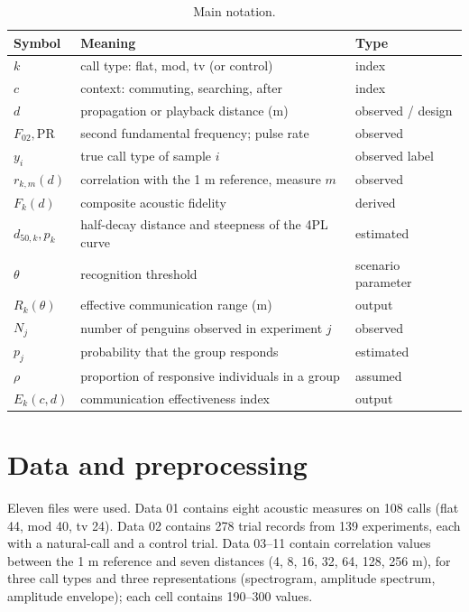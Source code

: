 \documentclass{apmcmthesis}
\begin{document}
\begin{table}[htbp]
\centering
\caption{Main notation.}
\small
\begin{tabular}{lll}
\toprule
Symbol & Meaning & Type \\
\midrule
$k$ & call type: flat, mod, tv (or control) & index \\
$c$ & context: commuting, searching, after & index \\
$d$ & propagation or playback distance (m) & observed / design \\
$F_{02}, \mathrm{PR}$ & second fundamental frequency; pulse rate & observed \\
$y_i$ & true call type of sample $i$ & observed label \\
$r_{k,m}(d)$ & correlation with the 1 m reference, measure $m$ & observed \\
$F_k(d)$ & composite acoustic fidelity & derived \\
$d_{50,k}, p_k$ & half-decay distance and steepness of the 4PL curve & estimated \\
$\theta$ & recognition threshold & scenario parameter \\
$R_k(\theta)$ & effective communication range (m) & output \\
$N_j$ & number of penguins observed in experiment $j$ & observed \\
$p_j$ & probability that the group responds & estimated \\
$\rho$ & proportion of responsive individuals in a group & assumed \\
$E_k(c,d)$ & communication effectiveness index & output \\
\bottomrule
\end{tabular}
\end{table}

\section{Data and preprocessing}

Eleven files were used. Data 01 contains eight acoustic measures on 108 calls (flat 44, mod 40,
tv 24). Data 02 contains 278 trial records from 139 experiments, each with a natural-call and a
control trial. Data 03--11 contain correlation values between the 1 m reference and seven
distances (4, 8, 16, 32, 64, 128, 256 m), for three call types and three representations
(spectrogram, amplitude spectrum, amplitude envelope); each cell contains 190--300 values.
\end{document}
